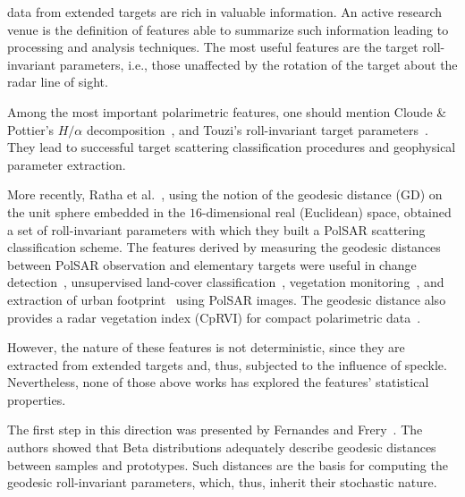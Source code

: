 \documentclass[journal]{IEEEtran}
\begin{document}
data from extended targets are rich in valuable information.
An active research venue is the definition of features able to summarize such information leading to processing and analysis techniques.
The most useful features are the target roll-invariant parameters, i.e., those unaffected by the rotation of the target about the radar line of sight.

Among the most important polarimetric features, one should mention Cloude \& Pottier's $H/\alpha$ decomposition~\cite{CloudePottier:97}, and Touzi's roll-invariant target parameters~\cite{Touzi:TGARS:2007}.
They lead to successful target scattering classification procedures and geophysical parameter extraction.

More recently, Ratha et al.~\cite{APolSARScatteringPowerFactorizationFrameworkandNovelRollInvariantParametersBasedUnsupervisedClassificationSchemeUsingaGeodesicDistanceinpress}, using the notion of the geodesic distance ($\text{GD}$) on the unit sphere embedded in the $16$-dimensional real (Euclidean) space, obtained a set of roll-invariant parameters with which they built a PolSAR scattering classification scheme. 
The features derived by measuring the geodesic distances between PolSAR observation and elementary targets were useful in
change detection~\cite{ChangeDetectionPolSARGeodesicDistanceBetweenScatteringMechanisms},
unsupervised land-cover classification~\cite{ClassificationPolSARGeodesic}, 
vegetation monitoring~\cite{AGeneralizedVolumeScatteringModelBasedVegetationIndexfromPolarimetricSARData2019}, and 
extraction of urban footprint~\cite{NovelTechniquesforBuiltupAreaExtractionfromPolarimetricSARImages2019} using PolSAR images.
The geodesic distance also provides a radar vegetation index (CpRVI) for compact polarimetric data~\cite{ARadarVegetationIndexforCropMonitoringUsingCompactPolarimetricSARData}. 

However, the nature of these features is not deterministic, since they are extracted from extended targets and, thus, subjected to the influence of speckle.
Nevertheless, none of those above works has explored the features' statistical properties.

The first step in this direction was presented by Fernandes and Frery~\cite{StatisticalPropertiesofGeodesicDistancesBetweenSamplesandElementaryScatterersinPolSARImagery2019}.
The authors showed that Beta distributions adequately describe geodesic distances between samples and prototypes.
Such distances are the basis for computing the geodesic roll-invariant parameters, which, thus, inherit their stochastic nature.
\end{document}
